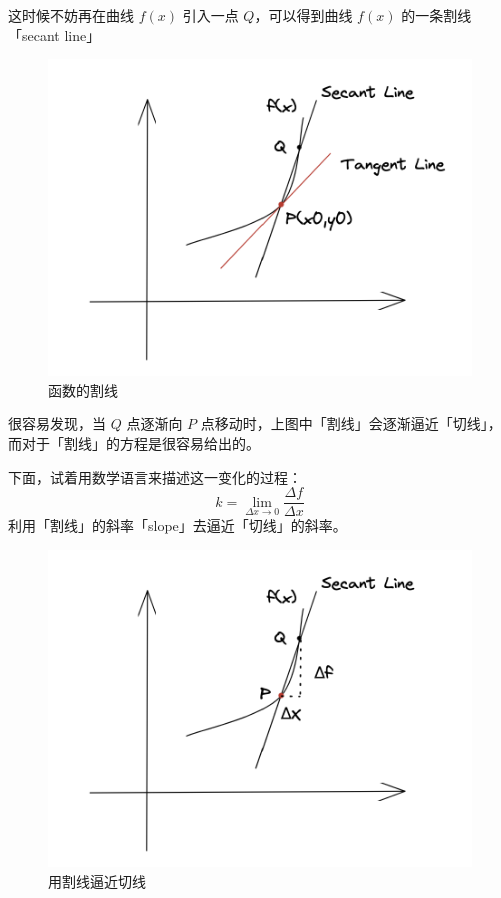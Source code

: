 \documentclass{ctexart}
\numberwithin{equation}{section}
\numberwithin{figure}{section}
\begin{document}
这时候不妨再在曲线 \(f(x)\) 引入一点 \(Q\)，可以得到曲线 \(f(x)\) 的一条割线「secant line」
\begin{figure}[H]
    \centering
    \includegraphics[scale=0.45]{images/introduceSecantLine.png}
    \caption{函数的割线}
\end{figure}

很容易发现，当 \(Q\) 点逐渐向 \(P\) 点移动时，上图中「割线」会逐渐逼近「切线」，而对于「割线」的方程是很容易给出的。

下面，试着用数学语言来描述这一变化的过程：
\begin{equation}
    k = \lim\limits_{\Delta x \to 0} \frac{\Delta f}{\Delta x}\label{eq:Deltaf/DeltaX}
\end{equation}
利用「割线」的斜率「slope」去逼近「切线」的斜率。
\begin{figure}[H]
    \centering
    \includegraphics[scale=0.45]{images/ScantL_Llimit_TangentL.png}
    \caption{用割线逼近切线}
\end{figure}
\end{document}

